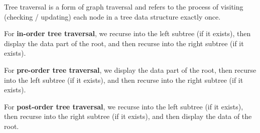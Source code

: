 \begin{definition}
    Tree traversal is a form of graph traversal and refers to the process of visiting (checking / updating) each node in a tree data structure exactly once.
\end{definition}

\begin{definition}
    For \textbf{in-order tree traversal}, we recurse into the left subtree (if it exists), then display the data part of the root, and then recurse into the right subtree (if it exists).
\end{definition}

\begin{definition}
    For \textbf{pre-order tree traversal}, we display the data part of the root, then recurse into the left subtree (if it exists), and then recurse into the right subtree (if it exists).
\end{definition}

\begin{definition}
    For \textbf{post-order tree traversal}, we recurse into the left subtree (if it exists), then recurse into the right subtree (if it exists), and then display the data of the root.
\end{definition}
